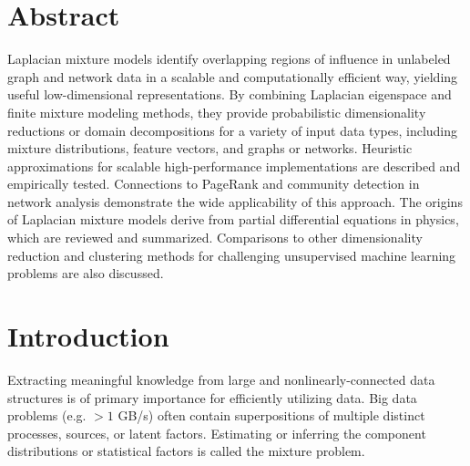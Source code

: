 \documentclass[10pt,letterpaper]{article}
\begin{document}
\section*{Abstract}
\noindent Laplacian mixture models identify overlapping regions of influence in unlabeled graph and network data in a scalable and computationally efficient way, yielding useful low-dimensional representations.
By combining Laplacian eigenspace and finite mixture modeling methods, they provide probabilistic dimensionality reductions or domain decompositions for a variety of input data types, including mixture distributions, feature vectors, and graphs or networks.
Heuristic approximations for scalable high-performance implementations are described and empirically tested.
Connections to PageRank and community detection in network analysis demonstrate the wide applicability of this approach.
The origins of Laplacian mixture models derive from partial differential equations in physics, which are reviewed and summarized.
Comparisons to other dimensionality reduction and clustering methods for challenging unsupervised machine learning problems are also discussed.

\linenumbers

\section*{Introduction}
Extracting meaningful knowledge from large and nonlinearly-connected data structures is of primary importance for efficiently utilizing data.
Big data problems (e.g. $> 1$ GB/s) often contain superpositions of multiple distinct processes, sources, or latent factors.
Estimating or inferring the component distributions or statistical factors is called the mixture problem.
\end{document}
